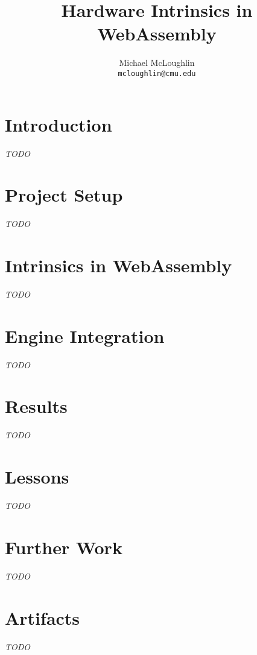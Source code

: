 \documentclass{article}
\newcommand{\wasm}{WebAssembly\xspace}
\begin{document}
\title{Hardware Intrinsics in \wasm}
\author{Michael McLoughlin \\ \texttt{mcloughlin@cmu.edu}}
\maketitle

\section{Introduction}
\emph{TODO}

\section{Project Setup}
\emph{TODO}

\section{Intrinsics in \wasm}
\emph{TODO}

\section{Engine Integration}
\emph{TODO}

\section{Results}
\emph{TODO}

\section{Lessons}
\emph{TODO}

\section{Further Work}
\emph{TODO}

\appendix

\section{Artifacts}
\emph{TODO}
\end{document}
